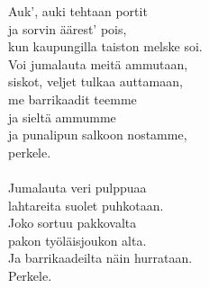
            Auk’, auki tehtaan portit \\
            ja sorvin äärest’ pois, \\
            kun kaupungilla taiston melske soi. \\
            Voi jumalauta meitä ammutaan, \\
            siskot, veljet tulkaa auttamaan, \\
            me barrikaadit teemme \\
            ja sieltä ammumme \\
            ja punalipun salkoon nostamme, \\
            perkele. \\
\hspace{10mm} \\
            Jumalauta veri pulppuaa \\
            lahtareita suolet puhkotaan. \\
            Joko sortuu pakkovalta \\
            pakon työläisjoukon alta. \\
            Ja barrikaadeilta näin hurrataan. \\
            Perkele. \\
